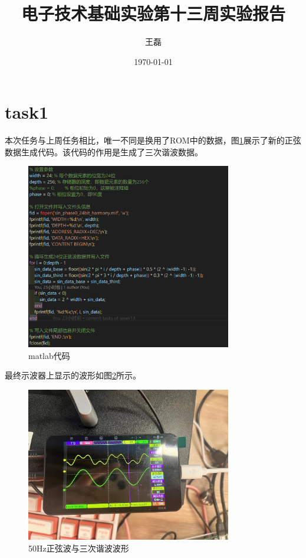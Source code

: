 \documentclass[UTF8]{ctexart}
\title{电子技术基础实验第十三周实验报告}
\author{王磊\quad2022012972}
\date{\today}
\begin{document}
\maketitle
\section{task1}
本次任务与上周任务相比，唯一不同是换用了ROM中的数据，图\ref{fig:matlab1}展示了新的正弦数据生成代码。该代码的作用是生成了三次谐波数据。
\begin{figure}[!ht]
    \centering
    \includegraphics[width=0.8\textwidth]{matlab1.png}
    \caption{matlab代码}
    \label{fig:matlab1}
\end{figure}

最终示波器上显示的波形如图\ref{fig:scope1}所示。
\begin{figure}[!ht]
    \centering
    \includegraphics[width=0.8\textwidth]{scope1.png}
    \caption{50Hz正弦波与三次谐波波形}
    \label{fig:scope1}
\end{figure}
\end{document}
